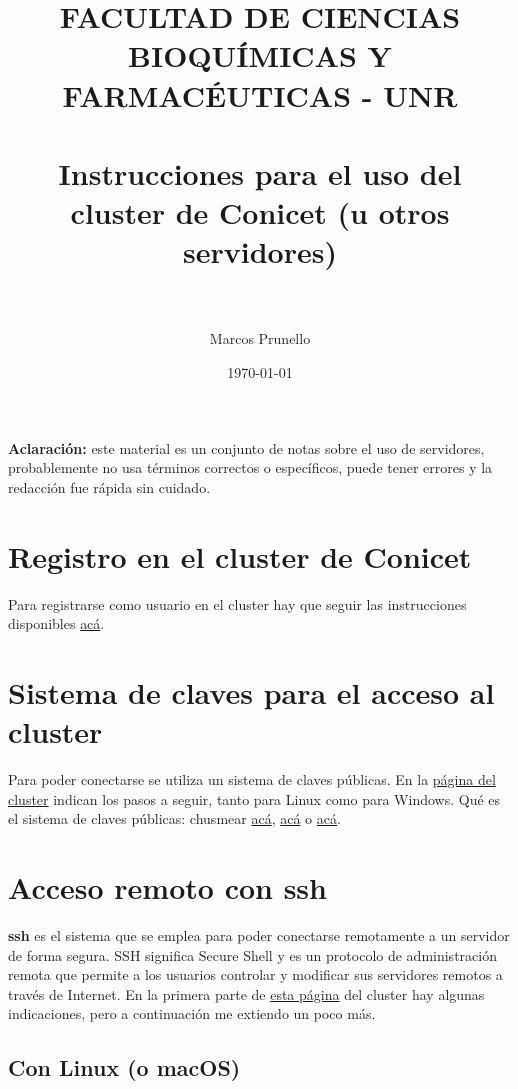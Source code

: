 \documentclass[paper=a4, fontsize=11pt]{scrartcl} %
\title{	
\normalfont \normalsize 
\textsc{FACULTAD DE CIENCIAS BIOQUÍMICAS Y FARMACÉUTICAS - UNR} \\ [25pt] %
\horrule{0.5pt} \\[0.4cm] %
\huge Instrucciones para el uso del cluster de Conicet (u otros servidores) \\ %
\horrule{2pt} \\[0.5cm] %
}
\author{Marcos Prunello} %
\date{\normalsize\today} %
\numberwithin{equation}{section} %
\numberwithin{figure}{section} %
\numberwithin{table}{section} %
\begin{document}
\maketitle %

\textbf{Aclaración:} este material es un conjunto de notas sobre el uso de servidores, probablemente no usa términos correctos o específicos, puede tener errores y la redacción fue rápida sin cuidado.

\tableofcontents

\section{Registro en el cluster de Conicet}

Para registrarse como usuario en el cluster hay que seguir las instrucciones disponibles \href{http://cluster.rosario-conicet.gov.ar/cluster\_registracion.php}{acá}. 


\section{Sistema de claves para el acceso al cluster}

Para poder conectarse se utiliza un sistema de claves públicas. En la  \href{http://cluster.rosario-conicet.gov.ar/cluster\_registracion.php}{página del cluster} indican los pasos a seguir, tanto para Linux como para Windows. Qué es el sistema de claves públicas: chusmear \href{https://voragine.net/linux/acceso-ssh-seguro-servidor-autenticacion-clave-publica}{acá}, \href{https://www.hostinger.es/tutoriales/que-es-ssh#gref}{acá} o \href{https://es.wikipedia.org/wiki/Criptograf%C3%ADa_asim%C3%A9trica}{acá}.

\section{Acceso remoto con ssh}

\textbf{ssh} es el sistema que se emplea para poder conectarse remotamente a un servidor de forma segura. SSH significa Secure Shell y es un protocolo de administración remota que permite a los usuarios controlar y modificar sus servidores remotos a través de Internet. En la primera parte de \href{http://cluster.rosario-conicet.gov.ar/cluster_utilizacion.php}{esta página} del cluster hay algunas indicaciones, pero a continuación me extiendo un poco más.

\subsection{Con Linux (o macOS)}
\end{document}
